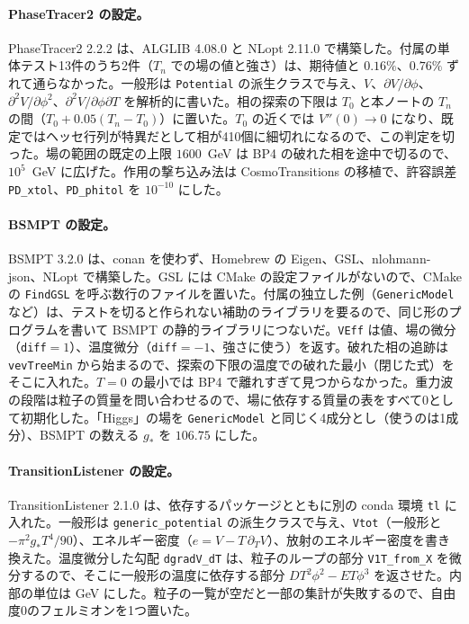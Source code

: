 \documentclass[a4paper,10pt]{ltjsarticle}
\begin{document}
\paragraph{PhaseTracer2 の設定。}PhaseTracer2 2.2.2 は、ALGLIB 4.08.0 と NLopt 2.11.0 で構築した。付属の単体テスト13件のうち2件（$T_n$ での場の値と強さ）は、期待値と $0.16\%$、$0.76\%$ ずれて通らなかった。一般形は \texttt{Potential} の派生クラスで与え、$V$、$\partial V/\partial\phi$、$\partial^2V/\partial\phi^2$、$\partial^2V/\partial\phi\partial T$ を解析的に書いた。相の探索の下限は $T_0$ と本ノートの $T_n$ の間（$T_0+0.05(T_n-T_0)$）に置いた。$T_0$ の近くでは $V''(0)\to0$ になり、既定ではヘッセ行列が特異だとして相が410個に細切れになるので、この判定を切った。場の範囲の既定の上限 $1600$~GeV は BP4 の破れた相を途中で切るので、$10^5$~GeV に広げた。作用の撃ち込み法は CosmoTransitions の移植で、許容誤差 \texttt{PD\_xtol}、\texttt{PD\_phitol} を $10^{-10}$ にした。

\paragraph{BSMPT の設定。}BSMPT 3.2.0 は、conan を使わず、Homebrew の Eigen、GSL、nlohmann-json、NLopt で構築した。GSL には CMake の設定ファイルがないので、CMake の \texttt{FindGSL} を呼ぶ数行のファイルを置いた。付属の独立した例（\texttt{GenericModel} など）は、テストを切ると作られない補助のライブラリを要るので、同じ形のプログラムを書いて BSMPT の静的ライブラリにつないだ。\texttt{VEff} は値、場の微分（\texttt{diff}$=1$）、温度微分（\texttt{diff}$=-1$、強さに使う）を返す。破れた相の追跡は \texttt{vevTreeMin} から始まるので、探索の下限の温度での破れた最小（閉じた式）をそこに入れた。$T=0$ の最小では BP4 で離れすぎて見つからなかった。重力波の段階は粒子の質量を問い合わせるので、場に依存する質量の表をすべて0として初期化した。「Higgs」の場を \texttt{GenericModel} と同じく4成分とし（使うのは1成分）、BSMPT の数える $g_*$ を $106.75$ にした。

\paragraph{TransitionListener の設定。}TransitionListener 2.1.0 は、依存するパッケージとともに別の conda 環境 \texttt{tl} に入れた。一般形は \texttt{generic\_potential} の派生クラスで与え、\texttt{Vtot}（一般形と $-\pi^2g_*T^4/90$）、エネルギー密度（$e=V-T\,\partial_TV$）、放射のエネルギー密度を書き換えた。温度微分した勾配 \texttt{dgradV\_dT} は、粒子のループの部分 \texttt{V1T\_from\_X} を微分するので、そこに一般形の温度に依存する部分 $DT^2\phi^2-ET\phi^3$ を返させた。内部の単位は GeV にした。粒子の一覧が空だと一部の集計が失敗するので、自由度0のフェルミオンを1つ置いた。
\end{document}
